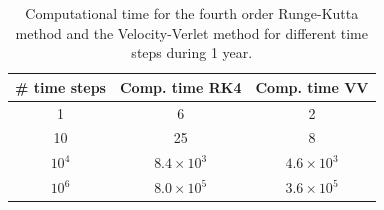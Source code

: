 \begin{table}[H]
\centering
\caption{
Computational time for the fourth order Runge-Kutta method and the Velocity-Verlet method for different time steps during 1 year.
}
\begin{center}
\begin{tabular}{ | c | c | c | }
  \hline			
  \# time steps  & Comp. time RK4 & Comp. time VV  
  \\ \hline
  1 & 6 & 2
  \\ \hline
  10 & 25 & 8
  \\ \hline
  $10^4$ & $8.4\times 10^3$ & $4.6\times 10^3$
  \\ \hline
  $10^6$ & $8.0\times 10^5$ & $3.6\times 10^5$
  \\ \hline
\end{tabular}
\end{center}
\label{tab:SunEarthMarsTest}
\end{table}
